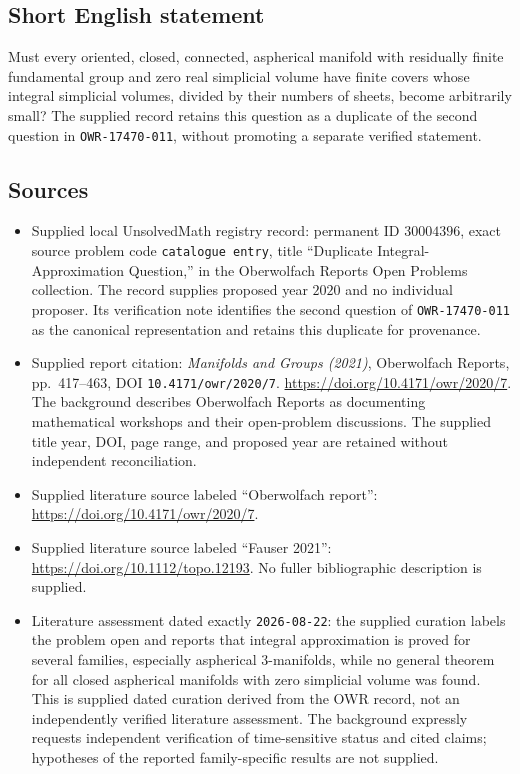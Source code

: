 \documentclass[11pt]{article}
\begin{document}
\subsection{Short English statement}
Must every oriented, closed, connected, aspherical manifold with residually finite fundamental group and zero real simplicial volume have finite covers whose integral simplicial volumes, divided by their numbers of sheets, become arbitrarily small? The supplied record retains this question as a duplicate of the second question in \texttt{OWR-17470-011}, without promoting a separate verified statement.
\subsection{Sources}
\begin{itemize}
\item Supplied local UnsolvedMath registry record: permanent ID \(30004396\), exact source problem code \texttt{catalogue entry}, title ``Duplicate Integral-Approximation Question,'' in the Oberwolfach Reports Open Problems collection. The record supplies proposed year \(2020\) and no individual proposer. Its verification note identifies the second question of \texttt{OWR-17470-011} as the canonical representation and retains this duplicate for provenance.
\item Supplied report citation: \emph{Manifolds and Groups (2021)}, Oberwolfach Reports, pp.\ 417--463, DOI \texttt{10.4171/owr/2020/7}. \url{https://doi.org/10.4171/owr/2020/7}. The background describes Oberwolfach Reports as documenting mathematical workshops and their open-problem discussions. The supplied title year, DOI, page range, and proposed year are retained without independent reconciliation.
\item Supplied literature source labeled ``Oberwolfach report'': \url{https://doi.org/10.4171/owr/2020/7}.
\item Supplied literature source labeled ``Fauser 2021'': \url{https://doi.org/10.1112/topo.12193}. No fuller bibliographic description is supplied.
\item Literature assessment dated exactly \texttt{2026-08-22}: the supplied curation labels the problem open and reports that integral approximation is proved for several families, especially aspherical \(3\)-manifolds, while no general theorem for all closed aspherical manifolds with zero simplicial volume was found. This is supplied dated curation derived from the OWR record, not an independently verified literature assessment. The background expressly requests independent verification of time-sensitive status and cited claims; hypotheses of the reported family-specific results are not supplied.
\end{itemize}
\end{document}
